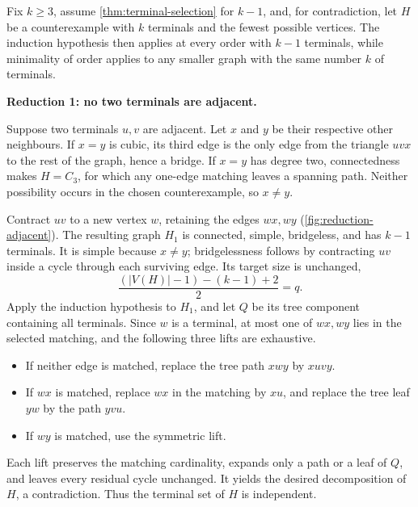 \documentclass[a4paper,11pt]{article}
\newcommand{\abs}[1]{\left\lvert#1\right\rvert}
\numberwithin{equation}{section}
\begin{document}
Fix $k\ge 3$, assume \cref{thm:terminal-selection} for
$k-1$, and, for contradiction, let $H$ be a counterexample with $k$ terminals
and the fewest possible vertices. The induction hypothesis then applies at
every order with $k-1$ terminals, while minimality of order applies to any
smaller graph with the same number $k$ of terminals.

\medskip\noindent\textbf{Reduction 1: no two terminals are adjacent.}

Suppose two terminals $u,v$ are adjacent. Let $x$ and $y$ be their respective
other neighbours. If $x=y$ is cubic, its third edge is the only edge from the
triangle $uvx$ to the rest of the graph, hence a bridge. If $x=y$ has degree
two, connectedness makes $H=C_3$, for which any one-edge matching leaves a
spanning path. Neither possibility occurs in the chosen counterexample, so
$x\ne y$.

Contract $uv$ to a new vertex $w$, retaining the edges $wx,wy$
(\cref{fig:reduction-adjacent}). The resulting graph $H_1$ is connected,
simple, bridgeless, and has $k-1$ terminals. It is simple because $x\ne y$;
bridgelessness follows by contracting $uv$ inside a cycle through each surviving
edge. Its target size is unchanged,
\[
  \frac{(\abs{V(H)}-1)-(k-1)+2}{2}=q .
\]
Apply the induction hypothesis to $H_1$, and let $Q$ be its tree component
containing all terminals. Since $w$ is a terminal, at most one of $wx,wy$ lies
in the selected matching, and the following three lifts are exhaustive.
\begin{itemize}
  \item If neither edge is matched, replace the tree path $xwy$ by $xuvy$.
  \item If $wx$ is matched, replace $wx$ in the matching by $xu$, and replace
    the tree leaf $yw$ by the path $yvu$.
  \item If $wy$ is matched, use the symmetric lift.
\end{itemize}
Each lift preserves the matching cardinality, expands only a path or a leaf of
$Q$, and leaves every residual cycle unchanged. It yields the desired
decomposition of $H$, a contradiction. Thus the terminal set of $H$ is
independent.
\end{document}

